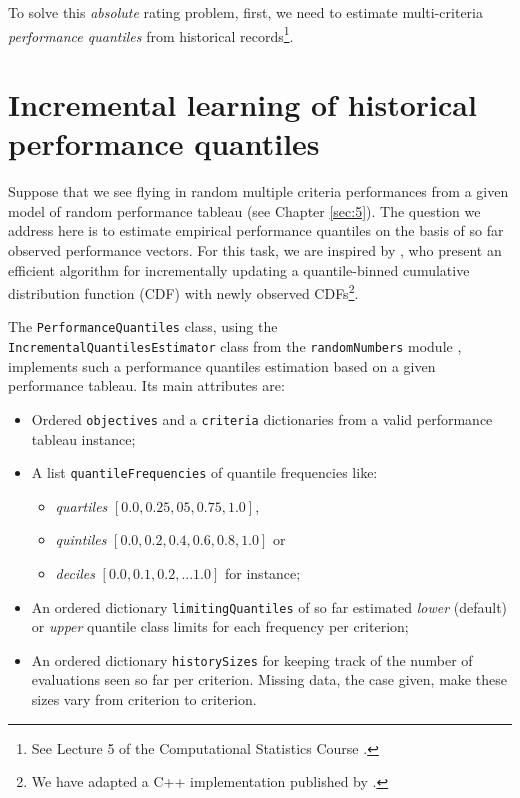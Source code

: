 To solve this \emph{absolute} rating problem, first, we need to estimate multi-criteria \emph{performance quantiles} from historical records\footnote{See Lecture 5 of the Computational Statistics Course \citep{CPSTAT-L5}.}.  

\section{Incremental learning of historical performance quantiles}
\label{sec:10.2}

Suppose that we see flying in random multiple criteria performances from a given model of random performance tableau (see Chapter \ref{sec:5}). The question we address here is to estimate empirical performance quantiles on the basis of so far observed performance vectors. For this task, we are inspired by \citep*{CHAM-2006}, who present an efficient algorithm for incrementally updating a quantile-binned cumulative distribution function (CDF) with newly observed CDFs\footnote{We have adapted a C++ implementation published by \citep*[Chapter 5]{NR3-2007}.}. 

The \texttt{PerformanceQuantiles} class, using the\\ \texttt{IncrementalQuantilesEstimator} class from the \texttt{randomNumbers} module , implements such a performance quantiles estimation based on a given performance tableau. Its main attributes are:
\begin{itemize}[rightmargin=0.5cm,leftmargin=0.5cm]
\item Ordered \texttt{objectives} and a \texttt{criteria} dictionaries from a valid performance tableau instance;
\item A list \texttt{quantileFrequencies} of quantile frequencies like:
  \begin{itemize}[nosep]
  \item \emph{quartiles} $[0.0, 0.25, 05, 0.75,1.0]$,
  \item  \emph{quintiles} $[0.0, 0.2, 0.4, 0.6, 0.8, 1.0]$ or
  \item  \emph{deciles} $[0.0, 0.1, 0.2, ... 1.0]$ for instance;
  \end{itemize}
\item An ordered  dictionary \texttt{limitingQuantiles} of so far estimated \emph{lower} (default) or \emph{upper} quantile class limits for each frequency per criterion;
\item An ordered dictionary \texttt{historySizes} for keeping track of the number of evaluations seen so far per criterion. Missing data, the case given, make these sizes vary from criterion to criterion.
\end{itemize}

